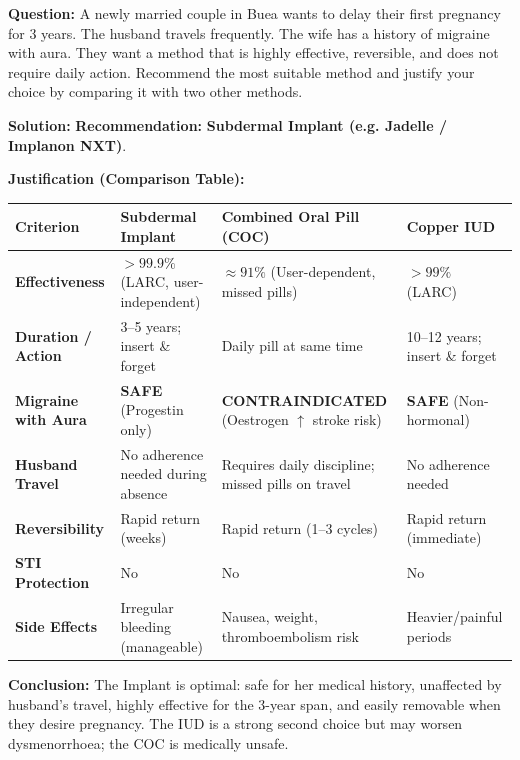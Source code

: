 \documentclass[11pt]{article}
\begin{document}
\begin{exoresolu}
\textbf{Question:} A newly married couple in Buea wants to delay their first pregnancy for 3 years. The husband travels frequently. The wife has a history of migraine with aura. They want a method that is highly effective, reversible, and does not require daily action. Recommend the most suitable method and justify your choice by comparing it with two other methods.

\textbf{Solution:}
\textbf{Recommendation:} \textbf{Subdermal Implant (e.g. Jadelle / Implanon NXT)}.

\textbf{Justification (Comparison Table):}

\begin{center}
\begin{tabularx}{\linewidth}{|l|X|X|X|}
\hline
\rowcolor{popblueL}
\textbf{Criterion} & \textbf{Subdermal Implant} & \textbf{Combined Oral Pill (COC)} & \textbf{Copper IUD} \\
\hline
\textbf{Effectiveness} & $>99.9\%$ (LARC, user-independent) & $\approx 91\%$ (User-dependent, missed pills) & $>99\%$ (LARC) \\
\hline
\textbf{Duration / Action} & 3--5 years; insert \& forget & Daily pill at same time & 10--12 years; insert \& forget \\
\hline
\textbf{Migraine with Aura} & \textbf{SAFE} (Progestin only) & \textbf{CONTRAINDICATED} (Oestrogen $\uparrow$ stroke risk) & \textbf{SAFE} (Non-hormonal) \\
\hline
\textbf{Husband Travel} & No adherence needed during absence & Requires daily discipline; missed pills on travel & No adherence needed \\
\hline
\textbf{Reversibility} & Rapid return (weeks) & Rapid return (1--3 cycles) & Rapid return (immediate) \\
\hline
\textbf{STI Protection} & No & No & No \\
\hline
\textbf{Side Effects} & Irregular bleeding (manageable) & Nausea, weight, thromboembolism risk & Heavier/painful periods \\
\hline
\end{tabularx}
\end{center}

\textbf{Conclusion:} The Implant is optimal: safe for her medical history, unaffected by husband's travel, highly effective for the 3-year span, and easily removable when they desire pregnancy. The IUD is a strong second choice but may worsen dysmenorrhoea; the COC is medically unsafe.
\end{exoresolu}
\end{document}
